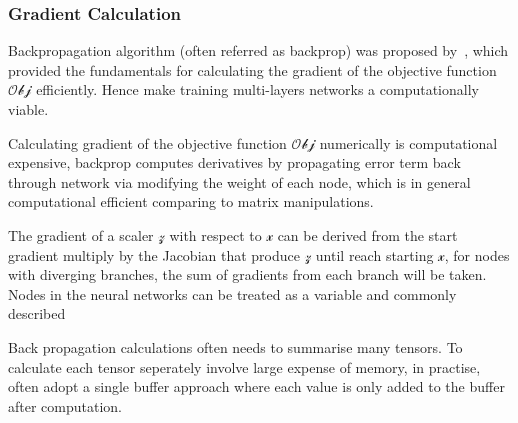 \subsubsection{Gradient Calculation}
Backpropagation algorithm (often referred as backprop) was proposed by~\citet{werbos1975beyond}, which provided the fundamentals for calculating the gradient of the objective function $\mathcal{Obj}$ efficiently. Hence make training multi-layers networks a computationally viable. 
\par
Calculating gradient of the objective function $\mathcal{Obj}$ numerically is computational expensive, backprop computes derivatives by propagating error term back through network via modifying the weight of each node, which is in general computational efficient comparing to matrix manipulations. 
\par
The gradient of a scaler $\mathcal{z}$ with respect to $\mathcal{x}$ can be derived from the start gradient multiply by the Jacobian that produce $\mathcal{z}$ until reach starting $\mathcal{x}$, for nodes with diverging branches, the sum of gradients from each branch will be taken. Nodes in the neural networks can be treated as a variable and commonly described 

Back propagation calculations often needs to summarise many tensors. To calculate each tensor seperately involve large expense of memory, in practise, often adopt a single buffer approach where each value is only added to the buffer after computation.